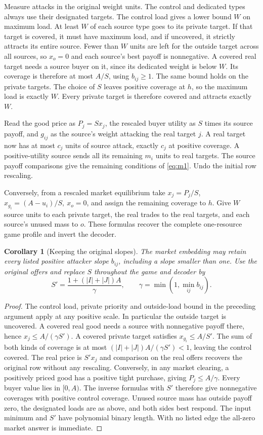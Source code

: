 \documentclass[11pt,oneside,openany,notitlepage]{report}
\newtheorem{corollary}[theorem]{Corollary}
\begin{document}
Measure attacks in the original weight units. The control and dedicated
types always use their designated targets. The control load gives a
lower bound \(W\) on maximum load. At least \(W\) of each source type
goes to its private target. If that target is covered, it must have
maximum load, and if uncovered, it strictly attracts its entire source.
Fewer than \(W\) units are left for the outside target across all sources,
so \(x_o=0\) and each source's best payoff is nonnegative. A covered real
target needs a source buyer on it, since its dedicated weight is below
\(W\). Its coverage is therefore at most \(A/S\), using \(b_{ij}\ge1\).
The same bound holds on the private targets. The choice of \(S\) leaves
positive coverage at \(h\), so the maximum load is exactly \(W\).
Every private target is therefore covered and attracts exactly \(W\).

Read the good price as \(P_j=Sx_j\), the rescaled buyer utility as \(S\)
times its source payoff, and \(g_{ij}\) as the source's weight attacking
the real target \(j\). A real target now has at most \(c_j\) units of
source attack, exactly \(c_j\) at positive coverage. A positive-utility
source sends all its remaining \(m_i\) units to real targets. The source
payoff comparisons give the remaining conditions of \eqref{eq:m1}.
Undo the initial row rescaling.

Conversely, from a rescaled market equilibrium take \(x_j=P_j/S\),
\(x_{g_i}=(A-u_i)/S,\ x_o=0\), and assign the remaining coverage to \(h\).
Give \(W\) source units to each private target, the real trades to the
real targets, and each source's unused mass to \(o\). These formulas
recover the complete one-resource game profile and invert the decoder.

\begin{corollary}[Keeping the original slopes]\label{cor:original-slopes}
The market embedding may retain every listed positive attacker slope
\(b_{ij}\), including a slope smaller than one. Use the original offers
and replace \(S\) throughout the game and decoder by
\[
 S'=\frac{1+(|I|+|J|)A}{\gamma},\qquad
 \gamma=\min(1,\min_{ij}b_{ij}).
\]
\end{corollary}
\begin{proof}
The control load, private priority and outside-load bound in the preceding
argument apply at any positive scale. In particular the outside target is
uncovered. A covered real good needs a source with nonnegative payoff
there, hence \(x_j\le A/(\gamma S')\). A covered private target satisfies
\(x_{g_i}\le A/S'\). The sum of both kinds of coverage is at most
\((|I|+|J|)A/(\gamma S')<1\), leaving the control covered. The real
price is \(S'x_j\) and comparison on the real offers recovers the original
row without any rescaling.
Conversely, in any market clearing, a positively priced good has a
positive tight purchase, giving \(P_j\le A/\gamma\). Every buyer value
lies in \([0,A)\). The inverse formulas with \(S'\) therefore give
nonnegative coverages with positive control coverage. Unused source mass
has outside payoff zero, the designated loads are as above, and both
sides best respond. The input minimum and \(S'\) have polynomial binary
length. With no listed edge the all-zero market answer is immediate.
\end{proof}
\end{document}
